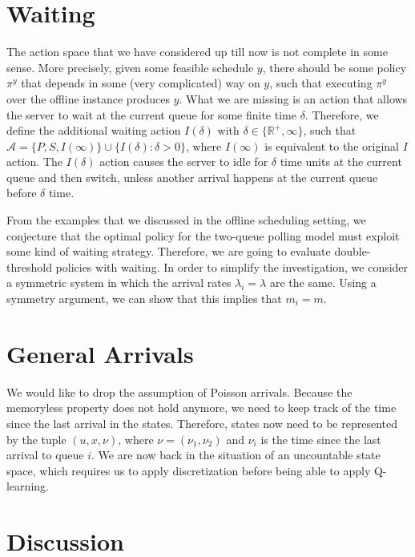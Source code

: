 \documentclass{article}
\theoremstyle{definition}
\theoremstyle{plain}
\begin{document}
\section{Waiting}

The action space that we have considered up till now is not complete in some
sense. More precisely, given some feasible schedule $y$, there should be some
policy $\pi^{y}$ that depends in some (very complicated) way on $y$, such that
executing $\pi^{y}$ over the offline instance produces $y$. What we are missing
is an action that allows the server to wait at the current queue for some finite
time $\delta$. Therefore, we define the additional waiting action $I(\delta)$
with $\delta \in \{ \mathbb{R}^{+}, \infty \}$, such that
$\mathcal{A} = \{ P, S, I(\infty) \} \cup \{ I(\delta) : \delta > 0 \}$, where
$I(\infty)$ is equivalent to the original $I$ action. The $I(\delta)$ action
causes the server to idle for $\delta$ time units at the current queue and then
switch, unless another arrival happens at the current queue before $\delta$
time.

From the examples that we discussed in the offline scheduling setting, we
conjecture that the optimal policy for the two-queue polling model must exploit
some kind of waiting strategy. Therefore, we are going to evaluate
double-threshold policies with waiting. In order to simplify the investigation,
we consider a symmetric system in which the arrival rates
$\lambda_{i} = \lambda$ are the same. Using a symmetry argument, we can show
that this implies that $m_{i} = m$.


\section{General Arrivals}

We would like to drop the assumption of Poisson arrivals. Because the memoryless
property does not hold anymore, we need to keep track of the time since the last
arrival in the states. Therefore, states now need to be represented by the tuple
$(u, x, \nu)$, where $\nu = (\nu_{1}, \nu_{2})$ and $\nu_{i}$ is the time since
the last arrival to queue $i$. We are now back in the situation of an
uncountable state space, which requires us to apply discretization before being
able to apply Q-learning.


\section{Discussion}
\end{document}
